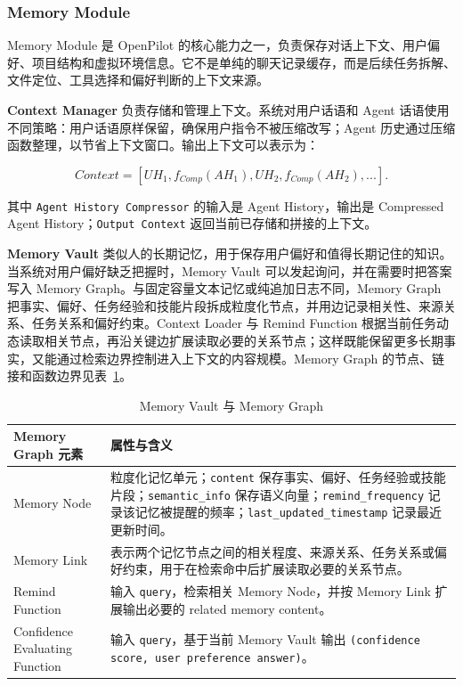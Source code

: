 \documentclass[12pt,a4paper]{ctexart}
\begin{document}
\subsubsection{Memory Module}

Memory Module 是 OpenPilot 的核心能力之一，负责保存对话上下文、用户偏好、项目结构和虚拟环境信息。它不是单纯的聊天记录缓存，而是后续任务拆解、文件定位、工具选择和偏好判断的上下文来源。

\textbf{Context Manager} 负责存储和管理上下文。系统对用户话语和 Agent 话语使用不同策略：用户话语原样保留，确保用户指令不被压缩改写；Agent 历史通过压缩函数整理，以节省上下文窗口。输出上下文可以表示为：

\[
Context=[UH_1,f_{Comp}(AH_1),UH_2,f_{Comp}(AH_2), ...].
\]

其中 \texttt{Agent History Compressor} 的输入是 Agent History，输出是 Compressed Agent History；\texttt{Output Context} 返回当前已存储和拼接的上下文。

\textbf{Memory Vault} 类似人的长期记忆，用于保存用户偏好和值得长期记住的知识。当系统对用户偏好缺乏把握时，Memory Vault 可以发起询问，并在需要时把答案写入 Memory Graph。与固定容量文本记忆或纯追加日志不同，Memory Graph 把事实、偏好、任务经验和技能片段拆成粒度化节点，并用边记录相关性、来源关系、任务关系和偏好约束。Context Loader 与 Remind Function 根据当前任务动态读取相关节点，再沿关键边扩展读取必要的关系节点；这样既能保留更多长期事实，又能通过检索边界控制进入上下文的内容规模。Memory Graph 的节点、链接和函数边界见表~\ref{tab:memory-vault-graph}。

\begin{table}[htbp]
  \centering
  \small
  \begin{tabularx}{\textwidth}{p{3.4cm} X}
    \toprule
    \textbf{Memory Graph 元素} & \textbf{属性与含义} \\
    \midrule
    Memory Node & 粒度化记忆单元；\texttt{content} 保存事实、偏好、任务经验或技能片段；\texttt{semantic\_info} 保存语义向量；\texttt{remind\_frequency} 记录该记忆被提醒的频率；\texttt{last\_updated\_timestamp} 记录最近更新时间。 \\
    Memory Link & 表示两个记忆节点之间的相关程度、来源关系、任务关系或偏好约束，用于在检索命中后扩展读取必要的关系节点。 \\
    Remind Function & 输入 \texttt{query}，检索相关 Memory Node，并按 Memory Link 扩展输出必要的 related memory content。 \\
    Confidence Evaluating Function & 输入 \texttt{query}，基于当前 Memory Vault 输出 \texttt{(confidence score, user preference answer)}。 \\
    \bottomrule
  \end{tabularx}
  \caption{Memory Vault 与 Memory Graph}
  \label{tab:memory-vault-graph}
\end{table}
\end{document}
